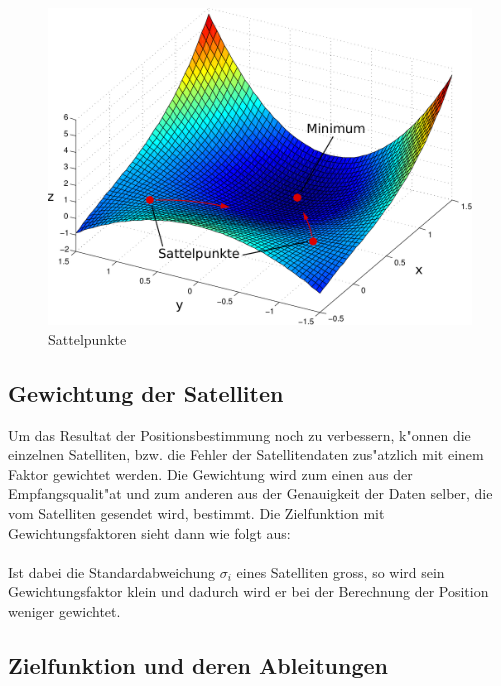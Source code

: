 		\begin{figure}[ht!]\centering
			\includegraphics[scale = 0.6]{gps/sattel.pdf}
			\caption{Sattelpunkte}
			\label{fig. Sattelpunkte}
		\end{figure}

	\subsection{Gewichtung der Satelliten}
		Um das Resultat der Positionsbestimmung noch zu verbessern, k"onnen die einzelnen Satelliten, bzw. die Fehler der Satellitendaten zus"atzlich mit einem Faktor gewichtet werden. Die Gewichtung wird zum einen aus der Empfangsqualit"at und zum anderen aus der Genauigkeit der Daten selber, die vom Satelliten gesendet wird, bestimmt. Die Zielfunktion mit Gewichtungsfaktoren sieht dann wie folgt aus:\\[0.2cm]
		\\[0.2cm]
		Ist dabei die Standardabweichung $\sigma_i$ eines Satelliten gross, so wird sein Gewichtungsfaktor klein und dadurch wird er bei der Berechnung der Position weniger gewichtet.
\newpage
	\subsection{Zielfunktion und deren Ableitungen}
